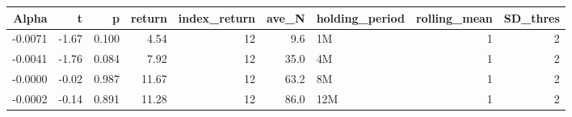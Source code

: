 \begin{table}[ht]
\centering
\begin{tabular}{rrrrrrlrr}
  \hline
Alpha & t & p & return & index\_return & ave\_N & holding\_period & rolling\_mean & SD\_thres \\ 
  \hline
-0.0071 & -1.67 & 0.100 & 4.54 & 12 & 9.6 & 1M &  1 &  2 \\ 
  -0.0041 & -1.76 & 0.084 & 7.92 & 12 & 35.0 & 4M &  1 &  2 \\ 
  -0.0000 & -0.02 & 0.987 & 11.67 & 12 & 63.2 & 8M &  1 &  2 \\ 
  -0.0002 & -0.14 & 0.891 & 11.28 & 12 & 86.0 & 12M &  1 &  2 \\ 
   \hline
\end{tabular}
\end{table}

